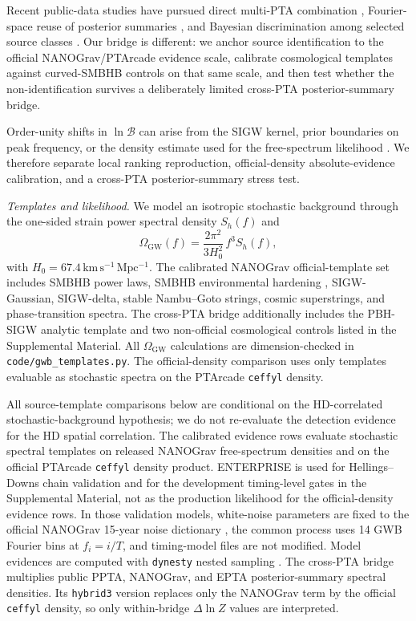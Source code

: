 \documentclass[aps,prl,reprint,superscriptaddress,nofootinbib,floatfix]{revtex4-2}
\begin{document}
Recent public-data studies have pursued direct multi-PTA combination
\cite{FivePTA_2026}, Fourier-space reuse of posterior summaries
\cite{Valtolina_Haasteren_2025}, and Bayesian discrimination among
selected source classes \cite{Lai_Li_2025,Wang_Zhang_Xu_2025}.  Our
bridge is different: we anchor source identification to the official
NANOGrav/PTArcade evidence scale, calibrate cosmological templates
against curved-SMBHB controls on that same scale, and then test whether
the non-identification survives a deliberately limited cross-PTA
posterior-summary bridge.

Order-unity shifts in $\ln\mathcal{B}$ can arise from the SIGW kernel,
prior boundaries on peak frequency, or the density estimate used for the
free-spectrum likelihood \cite{Kohri_Terada_2018}.  We therefore
separate local ranking reproduction, official-density absolute-evidence
calibration, and a cross-PTA posterior-summary stress test.

\emph{Templates and likelihood.}
We model an isotropic stochastic background through the one-sided strain
power spectral density $S_h(f)$ and
\begin{equation}
\Omega_\mathrm{GW}(f)
=\frac{2\pi^2}{3H_0^2}\,f^3 S_h(f),
\end{equation}
with $H_0=67.4\,\mathrm{km\,s^{-1}\,Mpc^{-1}}$.  The calibrated
NANOGrav official-template set includes SMBHB power laws, SMBHB
environmental hardening \cite{Sesana_2013,Sampson_2015},
SIGW-Gaussian, SIGW-delta, stable Nambu--Goto strings, cosmic
superstrings, and phase-transition spectra.  The cross-PTA bridge
additionally includes the PBH-SIGW analytic template and two
non-official cosmological controls listed in the Supplemental Material.
All $\Omega_\mathrm{GW}$ calculations are dimension-checked in
\texttt{code/gwb\_templates.py}.  The official-density comparison uses
only templates evaluable as stochastic spectra on the PTArcade
\texttt{ceffyl} density.

All source-template comparisons below are conditional on the
HD-correlated stochastic-background hypothesis; we do not re-evaluate the
detection evidence for the HD spatial correlation.
The calibrated evidence rows evaluate stochastic spectral templates on
released NANOGrav free-spectrum densities and on the official PTArcade
\texttt{ceffyl} density product.  ENTERPRISE \cite{ENTERPRISE_2019} is
used for Hellings--Downs chain validation and for the development
timing-level gates in the Supplemental Material, not as the production
likelihood for the official-density evidence rows.  In those validation
models, white-noise parameters are fixed to the official NANOGrav 15-year
noise dictionary \cite{NANOGrav_15yr_noise}, the common process uses 14
GWB Fourier bins at $f_i=i/T$, and timing-model files are not modified.
Model evidences are computed with \texttt{dynesty} nested sampling
\cite{Speagle_2020}.  The cross-PTA
bridge multiplies public PPTA, NANOGrav, and EPTA posterior-summary
spectral densities.  Its \texttt{hybrid3} version replaces only the
NANOGrav term by the official \texttt{ceffyl} density, so only
within-bridge $\Delta\ln Z$ values are interpreted.
\end{document}

